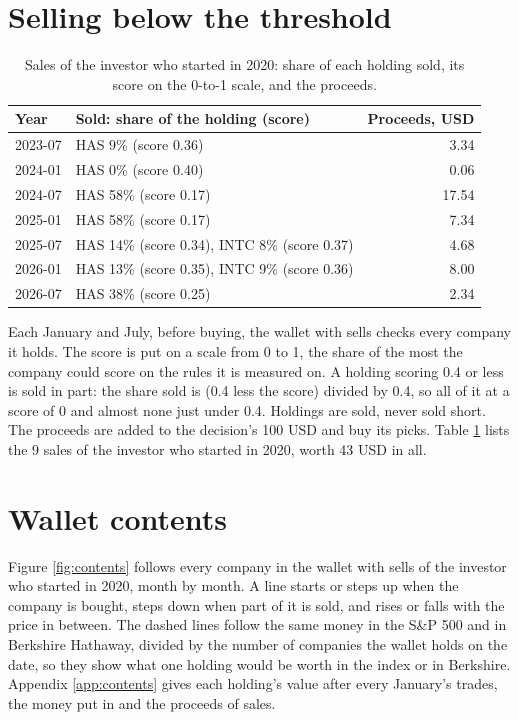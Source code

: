 \documentclass[11pt,a4paper]{article}
\begin{document}
\section{Selling below the threshold}
\label{sec:selling}
\begin{table}[H]
\centering
\small
\caption{Sales of the investor who started in 2020: share of each holding sold, its score on the 0-to-1 scale, and the proceeds.}\label{tab:sales}
\begin{tabular}{l p{11cm} r}
\hline
Year & Sold: share of the holding (score) & Proceeds, USD \\
\hline
2023-07 & HAS 9\% (score 0.36) & 3.34 \\
2024-01 & HAS 0\% (score 0.40) & 0.06 \\
2024-07 & HAS 58\% (score 0.17) & 17.54 \\
2025-01 & HAS 58\% (score 0.17) & 7.34 \\
2025-07 & HAS 14\% (score 0.34), INTC 8\% (score 0.37) & 4.68 \\
2026-01 & HAS 13\% (score 0.35), INTC 9\% (score 0.36) & 8.00 \\
2026-07 & HAS 38\% (score 0.25) & 2.34 \\
\hline
\end{tabular}
\end{table}
Each January and July, before buying, the wallet with sells checks every company it holds. The score is put on a scale from 0 to 1, the share of the most the company could score on the rules it is measured on. A holding scoring 0.4 or less is sold in part: the share sold is (0.4 less the score) divided by 0.4, so all of it at a score of 0 and almost none just under 0.4. Holdings are sold, never sold short. The proceeds are added to the decision's 100 USD and buy its picks. Table \ref{tab:sales} lists the 9 sales of the investor who started in 2020, worth 43 USD in all.

\section{Wallet contents}
Figure \ref{fig:contents} follows every company in the wallet with sells of the investor who started in 2020, month by month. A line starts or steps up when the company is bought, steps down when part of it is sold, and rises or falls with the price in between. The dashed lines follow the same money in the S\&P 500 and in Berkshire Hathaway, divided by the number of companies the wallet holds on the date, so they show what one holding would be worth in the index or in Berkshire. Appendix \ref{app:contents} gives each holding's value after every January's trades, the money put in and the proceeds of sales.
\end{document}
